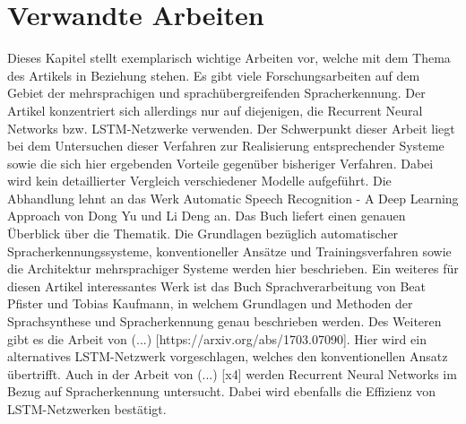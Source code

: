 \section{Verwandte Arbeiten}
Dieses Kapitel stellt exemplarisch wichtige Arbeiten vor, welche mit dem Thema des Artikels in Beziehung stehen. Es gibt viele Forschungsarbeiten auf dem Gebiet der mehrsprachigen und sprachübergreifenden Spracherkennung. Der Artikel konzentriert sich allerdings nur auf diejenigen, die Recurrent Neural Networks bzw. LSTM-Netzwerke verwenden. Der Schwerpunkt dieser Arbeit liegt bei dem Untersuchen dieser Verfahren zur Realisierung entsprechender Systeme sowie die sich hier ergebenden Vorteile gegenüber bisheriger Verfahren. Dabei wird kein detaillierter Vergleich verschiedener Modelle aufgeführt.  
Die Abhandlung lehnt an das Werk Automatic Speech Recognition - A Deep Learning Approach von Dong Yu und Li Deng \cite{Yu.2014} an. Das Buch liefert einen genauen Überblick über die Thematik. Die Grundlagen bezüglich automatischer Spracherkennungssysteme, konventioneller Ansätze und Trainingsverfahren sowie die Architektur mehrsprachiger Systeme werden hier beschrieben.
Ein weiteres für diesen Artikel interessantes Werk ist das Buch Sprachverarbeitung von Beat Pfister und Tobias Kaufmann, in welchem Grundlagen und Methoden der Sprachsynthese und Spracherkennung genau beschrieben werden.  
Des Weiteren gibt es die Arbeit von (...) [https://arxiv.org/abs/1703.07090]. Hier wird ein alternatives LSTM-Netzwerk vorgeschlagen, welches den konventionellen Ansatz übertrifft. Auch in der Arbeit von (...) [x4] werden Recurrent Neural Networks im Bezug auf Spracherkennung untersucht. Dabei wird ebenfalls die Effizienz von LSTM-Netzwerken bestätigt.    


